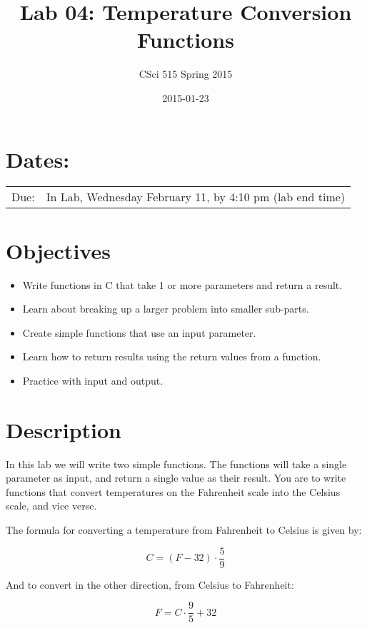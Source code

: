 \documentclass[11pt]{article}
\title{Lab 04: Temperature Conversion Functions}
\author{CSci 515 Spring 2015}
\date{2015-01-23}
\begin{document}
\maketitle


\section*{Dates:}
\label{sec-1}


\begin{center}
\begin{tabular}{ll}
 Due:  &  In Lab, Wednesday February 11, by 4:10 pm (lab end time)  \\
\end{tabular}
\end{center}
\section*{Objectives}
\label{sec-2}

\begin{itemize}
\item Write functions in C that take 1 or more parameters and return a result.
\item Learn about breaking up a larger problem into smaller sub-parts.
\item Create simple functions that use an input parameter.
\item Learn how to return results using the return values from a function.
\item Practice with input and output.
\end{itemize}
\section*{Description}
\label{sec-3}

In this lab we will write two simple functions.  The functions will
take a single parameter as input, and return a single value as their
result.  You are to write functions that convert temperatures
on the Fahrenheit scale into the Celsius scale, and vice verse.

The formula for converting a temperature from Fahrenheit to Celsius is
given by:

$$
C = (F - 32) \cdot \frac{5}{9}
$$

And to convert in the other direction, from Celsius to Fahrenheit:

$$
F = C \cdot \frac{9}{5} + 32
$$
\end{document}
